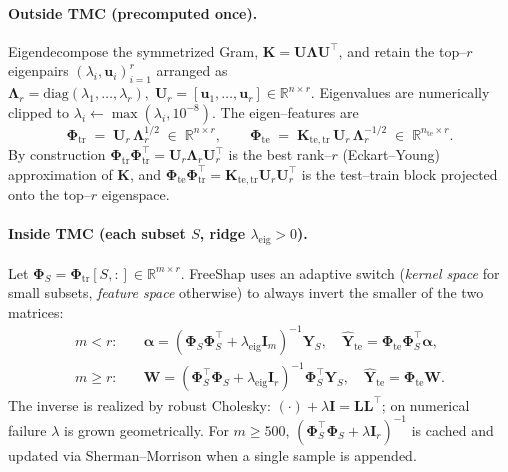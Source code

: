 \paragraph{Outside TMC (precomputed once).}
Eigendecompose the symmetrized Gram, $\mathbf{K}=\mathbf{U}\boldsymbol{\Lambda}\mathbf{U}^{\!\top}$, and retain the top--$r$ eigenpairs $(\lambda_i,\mathbf{u}_i)_{i=1}^{r}$ arranged as
$
\boldsymbol{\Lambda}_r=\mathrm{diag}(\lambda_1,\dots,\lambda_r), \; \mathbf{U}_r=[\mathbf{u}_1,\dots,\mathbf{u}_r]\in\mathbb{R}^{n\times r}.
$
Eigenvalues are numerically clipped to $\lambda_i \gets \max(\lambda_i,10^{-8})$. The eigen--features are
\begin{equation}
\boxed{\;
\boldsymbol{\Phi}_{\mathrm{tr}} \;=\; \mathbf{U}_r\,\boldsymbol{\Lambda}_r^{1/2}\;\in\;\mathbb{R}^{n\times r},
\qquad
\boldsymbol{\Phi}_{\mathrm{te}} \;=\; \mathbf{K}_{\mathrm{te,tr}}\,\mathbf{U}_r\,\boldsymbol{\Lambda}_r^{-1/2}\;\in\;\mathbb{R}^{n_{\mathrm{te}}\times r}.\;}
\label{eq:phi-eigen}
\end{equation}
By construction $\boldsymbol{\Phi}_{\mathrm{tr}}\boldsymbol{\Phi}_{\mathrm{tr}}^{\!\top}=\mathbf{U}_r\boldsymbol{\Lambda}_r\mathbf{U}_r^{\!\top}$ is the best rank--$r$ (Eckart--Young) approximation of $\mathbf{K}$, and $\boldsymbol{\Phi}_{\mathrm{te}}\boldsymbol{\Phi}_{\mathrm{tr}}^{\!\top}=\mathbf{K}_{\mathrm{te,tr}}\mathbf{U}_r\mathbf{U}_r^{\!\top}$ is the test--train block projected onto the top--$r$ eigenspace.

\paragraph{Inside TMC (each subset $S$, ridge $\lambda_{\mathrm{eig}}\!>\!0$).}
Let $\boldsymbol{\Phi}_S = \boldsymbol{\Phi}_{\mathrm{tr}}[S,:]\in\mathbb{R}^{m\times r}$. FreeShap uses an adaptive switch (\emph{kernel space} for small subsets, \emph{feature space} otherwise) to always invert the smaller of the two matrices:
\begin{align}
m<r: &\quad
\boldsymbol{\alpha}=(\boldsymbol{\Phi}_S\boldsymbol{\Phi}_S^{\!\top}+\lambda_{\mathrm{eig}}\mathbf{I}_m)^{-1}\mathbf{Y}_S,\quad
\widehat{\mathbf{Y}}_{\mathrm{te}}=\boldsymbol{\Phi}_{\mathrm{te}}\boldsymbol{\Phi}_S^{\!\top}\boldsymbol{\alpha},
\label{eq:eig-kspace}\\[2pt]
m\ge r: &\quad
\mathbf{W}=(\boldsymbol{\Phi}_S^{\!\top}\boldsymbol{\Phi}_S+\lambda_{\mathrm{eig}}\mathbf{I}_r)^{-1}\boldsymbol{\Phi}_S^{\!\top}\mathbf{Y}_S,\quad
\widehat{\mathbf{Y}}_{\mathrm{te}}=\boldsymbol{\Phi}_{\mathrm{te}}\mathbf{W}.
\label{eq:eig-fspace}
\end{align}
The inverse is realized by robust Cholesky: $(\cdot)+\lambda\mathbf{I} = \mathbf{L}\mathbf{L}^{\!\top}$; on numerical failure $\lambda$ is grown geometrically. For $m\!\ge\!500$, $(\boldsymbol{\Phi}_S^{\!\top}\boldsymbol{\Phi}_S+\lambda\mathbf{I}_r)^{-1}$ is cached and updated via Sherman--Morrison when a single sample is appended.

